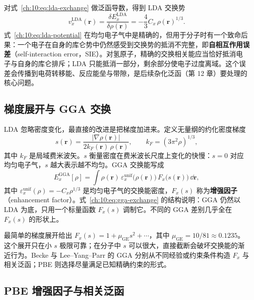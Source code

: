 对式~\eqref{ch:10:eq:lda-exchange} 做泛函导数，得到 LDA 交换势
\begin{equation}
v_x^{\mathrm{LDA}}(\mathbf r)
= \frac{\delta E_x^{\mathrm{LDA}}}{\delta\rho(\mathbf r)}
= -\frac{4}{3}C_x\,\rho(\mathbf r)^{1/3}.
\label{ch:10:eq:lda-potential}
\end{equation}
式~\eqref{ch:10:eq:lda-potential} 在均匀电子气中是精确的，但用于分子时有一个致命后果：一个电子在自身的库仑势中仍然感受到交换势的抵消不完整，即\textbf{自相互作用误差}（self-interaction error，SIE）。对氢原子，精确的交换相关能应当恰好抵消电子与自身的库仑排斥；LDA 只能抵消一部分，剩余部分使电子过度离域。这个误差会传播到电荷转移能、反应能垒与带隙，是后续杂化泛函（第 12 章）要处理的核心问题。

\subsection{梯度展开与 GGA 交换}
\label{ch:10:sec:gga}

LDA 忽略密度变化，最直接的改进是把梯度加进来。定义无量纲的约化密度梯度
\begin{equation}
s(\mathbf r)=\frac{\lvert\nabla\rho(\mathbf r)\rvert}{2k_F(\mathbf r)\,\rho(\mathbf r)},
\qquad
k_F=(3\pi^2\rho)^{1/3},
\label{ch:10:eq:reduced-gradient}
\end{equation}
其中 $k_F$ 是局域费米波矢。$s$ 衡量密度在费米波长尺度上变化的快慢：$s=0$ 对应均匀电子气，$s$ 越大表示越不均匀。GGA 交换能写成
\begin{equation}
E_x^{\mathrm{GGA}}[\rho]
= \int \rho(\mathbf r)\,\varepsilon_x^{\mathrm{unif}}\big(\rho(\mathbf r)\big)\,
F_x\big(s(\mathbf r)\big)\,\dd\mathbf r ,
\label{ch:10:eq:gga-exchange}
\end{equation}
其中 $\varepsilon_x^{\mathrm{unif}}(\rho)=-C_x\rho^{1/3}$ 是均匀电子气的交换能密度，$F_x(s)$ 称为\textbf{增强因子}（enhancement factor）。式~\eqref{ch:10:eq:gga-exchange} 的结构说明：GGA 仍然以 LDA 为底，只用一个标量函数 $F_x(s)$ 调制它。不同的 GGA 差别几乎全在 $F_x(s)$ 的形状上。

最简单的梯度展开给出 $F_x(s)=1+\mu_{\mathrm{GE}}s^2+\cdots$，其中 $\mu_{\mathrm{GE}}=10/81\approx 0.1235$。这个展开只在小 $s$ 极限可靠；在分子中 $s$ 可以很大，直接截断会破坏交换能的渐近行为。Becke 与 Lee--Yang--Parr 的 GGA 分别从不同经验或约束条件构造 $F_x$ 与相关泛函\citep{becke1988,lee1988}；PBE 则选择尽量满足已知精确约束的形式\citep{perdew1996pbe}。

\subsection{PBE 增强因子与相关泛函}
\label{ch:10:sec:pbe}

